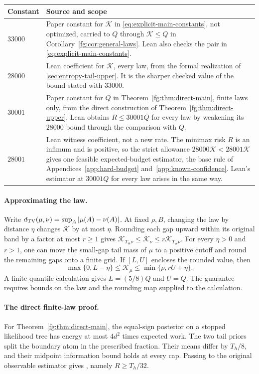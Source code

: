 \begin{center}\small
\begin{tabularx}{\textwidth}{@{}lX@{}}
\toprule
Constant & Source and scope\\
\midrule
$33000$ & Paper constant for $\mathcal K$ in
\eqref{eq:explicit-main-constants}, not optimized, carried to $Q$ through
$\mathcal K\le Q$ in Corollary~\ref{fg:cor:general-laws}. Lean also
checks the pair in \eqref{eq:explicit-main-constants}.\\
$28000$ & Lean coefficient for $\mathcal K$, every law, from the formal
realization of \cref{sec:entropy-tail-upper}. It is the sharper checked
value of the bound stated with $33000$.\\
$30001$ & Paper constant for $Q$ in Theorem~\ref{fg:thm:direct-main}, finite
laws only, from the direct construction of
Theorem~\ref{fg:thm:direct-upper}. Lean obtains $R\le30001Q$ for every law
by weakening its $28000$ bound through the comparison with $Q$.\\
$28001$ & Lean witness coefficient, not a new rate. The minimax risk $R$ is
an infimum and is positive, so the strict allowance
$28000\mathcal K<28001\mathcal K$ gives one feasible expected-budget
estimator, the base rule of Appendices~\ref{app:hard-budget}
and~\ref{app:known-confidence}. Lean's estimator at $30001Q$ for every law
arises in the same way.\\
\bottomrule
\end{tabularx}
\end{center}

\paragraph{Approximating the law.}
Write $d_{\rm TV}(\mu,\nu)=\sup_A|\mu(A)-\nu(A)|$.
At fixed $\rho,B$, changing the law by distance $\eta$ changes
$\mathcal K$ by at most $\eta$. Rounding each gap upward within its
original band by a factor at most $r\ge1$ gives
$\mathcal K_{T_\#\nu}\le\mathcal K_\nu\le r\mathcal K_{T_\#\nu}$.
For every $\eta>0$ and $r>1$, one can move the small-gap tail mass of
$\mu$ to a positive cutoff and round the remaining gaps onto a finite
grid. If $[L,U]$ encloses the rounded value, then
\[
  \max\{0,L-\eta\}\le\mathcal K_\mu\le\min\{\rho,rU+\eta\}.
\]
A finite quantile calculation gives $L=(5/8)Q$ and $U=Q$. The guarantee
requires bounds on the law and the rounding map supplied to the calculation.

\paragraph{The direct finite-law proof.}
For Theorem~\ref{fg:thm:direct-main}, the equal-sign posterior on a
stopped likelihood tree has energy at most $4d^2$ times expected work.
The two tail priors split the boundary atom in the prescribed fraction.
Their means differ by $T_h/8$, and their midpoint information bound holds
at every cap. Passing to the original observable estimator gives
, namely $R\ge T_h/32$.

